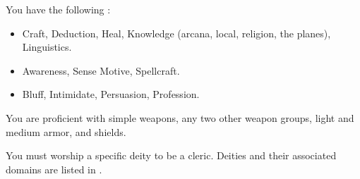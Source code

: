         You have the following :
        \begin{itemize}
            \item {} Craft, Deduction, Heal, Knowledge (arcana, local, religion, the planes), Linguistics.
            \item {} Awareness, Sense Motive, Spellcraft.
            \item {} Bluff, Intimidate, Persuasion, Profession.
        \end{itemize}

        You are proficient with simple weapons, any two other weapon groups, light and medium armor, and shields.

        You must worship a specific deity to be a cleric.
        Deities and their associated domains are listed in .

